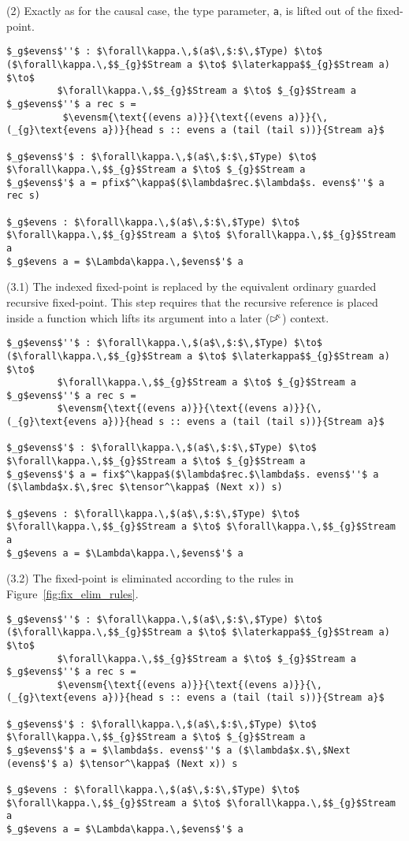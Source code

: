 (2) Exactly as for the causal case, the type parameter, \texttt{a}, is lifted out of the fixed-point.
\begin{lstlisting}[mathescape]
$_g$evens$''$ : $\forall\kappa.\,$(a$\,$:$\,$Type) $\to$ ($\forall\kappa.\,$$_{g}$Stream a $\to$ $\laterkappa$$_{g}$Stream a) $\to$ 
         $\forall\kappa.\,$$_{g}$Stream a $\to$ $_{g}$Stream a
$_g$evens$''$ a rec s =
          $\evensm{\text{(evens a)}}{\text{(evens a)}}{\,(_{g}\text{evens a})}{head s :: evens a (tail (tail s))}{Stream a}$

$_g$evens$'$ : $\forall\kappa.\,$(a$\,$:$\,$Type) $\to$ $\forall\kappa.\,$$_{g}$Stream a $\to$ $_{g}$Stream a
$_g$evens$'$ a = pfix$^\kappa$($\lambda$rec.$\lambda$s. evens$''$ a rec s)

$_g$evens : $\forall\kappa.\,$(a$\,$:$\,$Type) $\to$ $\forall\kappa.\,$$_{g}$Stream a $\to$ $\forall\kappa.\,$$_{g}$Stream a
$_g$evens a = $\Lambda\kappa.\,$evens$'$ a
\end{lstlisting}
(3.1) The indexed fixed-point is replaced by the equivalent ordinary guarded
recursive fixed-point. This step requires that the recursive reference is
placed inside a function which lifts its argument into a later ($\rhd^{\!\!\kappa}$) context.
\begin{lstlisting}[mathescape]
$_g$evens$''$ : $\forall\kappa.\,$(a$\,$:$\,$Type) $\to$ ($\forall\kappa.\,$$_{g}$Stream a $\to$ $\laterkappa$$_{g}$Stream a) $\to$ 
         $\forall\kappa.\,$$_{g}$Stream a $\to$ $_{g}$Stream a
$_g$evens$''$ a rec s =
         $\evensm{\text{(evens a)}}{\text{(evens a)}}{\,(_{g}\text{evens a})}{head s :: evens a (tail (tail s))}{Stream a}$

$_g$evens$'$ : $\forall\kappa.\,$(a$\,$:$\,$Type) $\to$ $\forall\kappa.\,$$_{g}$Stream a $\to$ $_{g}$Stream a
$_g$evens$'$ a = fix$^\kappa$($\lambda$rec.$\lambda$s. evens$''$ a ($\lambda$x.$\,$rec $\tensor^\kappa$ (Next x)) s)

$_g$evens : $\forall\kappa.\,$(a$\,$:$\,$Type) $\to$ $\forall\kappa.\,$$_{g}$Stream a $\to$ $\forall\kappa.\,$$_{g}$Stream a
$_g$evens a = $\Lambda\kappa.\,$evens$'$ a
\end{lstlisting}
(3.2) The fixed-point is eliminated according to the rules in Figure~\ref{fig:fix_elim_rules}.
\begin{lstlisting}[mathescape]
$_g$evens$''$ : $\forall\kappa.\,$(a$\,$:$\,$Type) $\to$ ($\forall\kappa.\,$$_{g}$Stream a $\to$ $\laterkappa$$_{g}$Stream a) $\to$ 
         $\forall\kappa.\,$$_{g}$Stream a $\to$ $_{g}$Stream a
$_g$evens$''$ a rec s =
         $\evensm{\text{(evens a)}}{\text{(evens a)}}{\,(_{g}\text{evens a})}{head s :: evens a (tail (tail s))}{Stream a}$

$_g$evens$'$ : $\forall\kappa.\,$(a$\,$:$\,$Type) $\to$ $\forall\kappa.\,$$_{g}$Stream a $\to$ $_{g}$Stream a
$_g$evens$'$ a = $\lambda$s. evens$''$ a ($\lambda$x.$\,$Next (evens$'$ a) $\tensor^\kappa$ (Next x)) s

$_g$evens : $\forall\kappa.\,$(a$\,$:$\,$Type) $\to$ $\forall\kappa.\,$$_{g}$Stream a $\to$ $\forall\kappa.\,$$_{g}$Stream a
$_g$evens a = $\Lambda\kappa.\,$evens$'$ a
\end{lstlisting}
